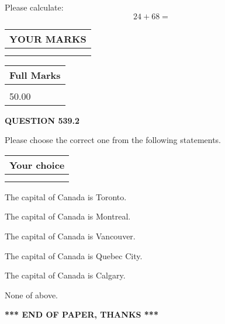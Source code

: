\documentclass[12pt]{article}
\begin{document}
  
 
Please calculate:
\begin{equation}
24 +  %
68 = \nonumber
\end{equation}
 

 

 
  
\vspace{0.2in}
  
\noindent\begin{tabular}{|l|}
\hline
 YOUR MARKS  \\
\hline
 \\ 
 \\ 
\hline
\end{tabular}
\hspace{0.05in} \begin{tabular}{|l|}
\hline
 Full Marks  \\
\hline
 \\ 
50.00 \\
\hline
\end{tabular}
{\textbf{\Large{QUESTION
539.2 
}}}
  
  
Please choose the correct one from the following statements.
  
  
\noindent\hspace{3.0in} \begin{tabular}{|l|}
\hline
Your choice \\
\hline
 \\ 
 \\ 
\hline
\end{tabular}
  
  
 
 
The capital of Canada is Toronto.
 
 
The capital of Canada is Montreal.
 
 
The capital of Canada is Vancouver.
 
 
The capital of Canada is Quebec City.
 
 
The capital of Canada is Calgary.
 
 
 None of above.
 
 
   
   
 \vspace{0.2in}
 
   
   
   
   
\vspace{1.0in} 
{\textbf{\large{ *** END OF PAPER, THANKS *** }}} 
   
\end{document}
